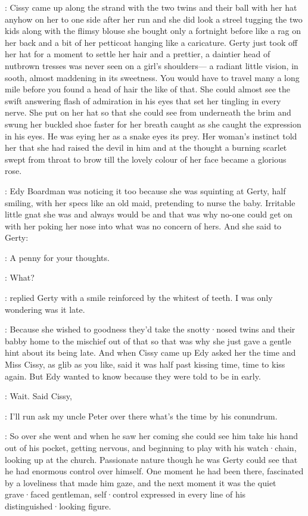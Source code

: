 :
Cissy came up along the strand
with the two twins
and their ball
with her hat anyhow on her to one side
after her run
and she did look a streel
tugging the two kids along
with the flimsy blouse
she bought only a fortnight before
like a rag on her back
and a bit of her petticoat
hanging like a caricature.
Gerty just took off her hat
for a moment to settle her hair
and a prettier,
a daintier head of nutbrown tresses
was never seen on a girl's shoulders—%
a radiant little vision,
in sooth,
almost maddening
in its sweetness.
You would have to travel
many a long mile
before you found
a head of hair
the like of that.
She could almost see
the swift answering flash of admiration in his eyes
that set her tingling
in every nerve.
She put on her hat
so that she could see from underneath
the brim
and swung her buckled shoe faster
for her breath caught
as she caught the expression
in his eyes.
He was eying her as a snake eyes its prey.
Her woman's instinct told her
that she had raised the devil in him
and at the thought
a burning scarlet
swept from throat to brow
till the lovely colour of her face
became a glorious rose.

:
Edy Boardman was noticing it too
because she was squinting at Gerty,
half smiling,
with her specs
like an old maid,
pretending to nurse the baby.
Irritable little gnat she was
and always would be
and that was why no-one could get on with her
poking her nose
into what was no concern of hers.
And she said to Gerty:

\edy:
A penny for your thoughts.

\gerty:
What?

:
replied Gerty
with a smile
reinforced by the whitest of teeth.
I was only wondering
was it late.

:
Because
she wished to goodness
they'd take the snotty·nosed twins and their babby home
to the mischief
out of that
so that was
why she just gave a gentle hint
about its being late.
And when Cissy came up
Edy asked her the time
and Miss Cissy,
as glib as you like,
said it was half past kissing time,
time to kiss again.
But Edy wanted to know
because they were told
to be in early.

\cissy:
Wait.
Said Cissy,

\cissy:
I'll run
ask my uncle Peter over there
what's the time
by his conundrum.

:
So over she went
and when he saw her coming
she could see him take his hand
out of his pocket,
getting nervous,
and beginning to play with his
watch·chain,
looking up at the church.
Passionate nature though he was
Gerty could see
that he had enormous control over himself.
One moment
he had been there,
fascinated by a loveliness
that made him gaze,
and the next moment
it was the quiet grave·faced gentleman,
self·control expressed
in every line of his distinguished·looking figure.

